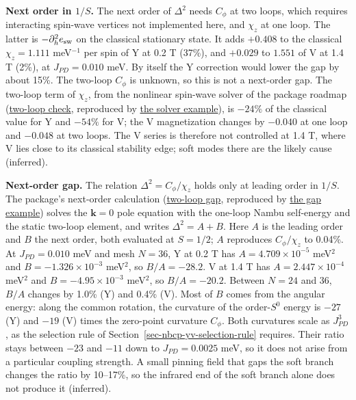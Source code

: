 \textbf{Next order in \(1/S\).} The next order of \(\Delta^2\) needs
\(C_\phi\) at two loops, which requires interacting spin-wave vertices
not implemented here, and \(\chi_z\) at one loop. The latter is
\(-\partial_h^2e_{\rm sw}\) on the classical stationary state. It adds
\(+0.408\) to the classical \(\chi_z=1.111\) meV\(^{-1}\) per spin of
Y at 0.2 T (37\%), and \(+0.029\) to \(1.551\) of V at 1.4 T (2\%), at
\(J_{PD}=0.010\) meV. By itself the Y correction would lower the gap by
about 15\%. The two-loop \(C_\phi\) is unknown, so this is not a
next-order gap. The two-loop term of \(\chi_z\), from the nonlinear
spin-wave solver of the package roadmap
(\href{../../../data-space/verification/261003-nbcp-nonlinear-spin-waves/nbcp-nonlinear-spin-waves.json}{two-loop
check}, reproduced by
\href{../../../examples/nbcp_nonlinear_spin_waves.py}{the solver
example}), is \(-24\%\) of the classical
value for Y and \(-54\%\) for V; the V magnetization changes by
\(-0.040\) at one loop and \(-0.048\) at two loops. The V series is
therefore not controlled at 1.4 T, where V lies close to its classical
stability edge; soft modes there are the likely cause (inferred).

\textbf{Next-order gap.} The relation \(\Delta^2=C_\phi/\chi_z\) holds
only at leading order in \(1/S\). The package's next-order calculation
(\href{../../../data-space/verification/261003-nbcp-two-loop-gap/nbcp-two-loop-gap.json}{two-loop
gap}, reproduced by
\href{../../../examples/nbcp_pseudo_goldstone_two_loop.py}{the gap
example}) solves the \(\mathbf k=0\) pole equation with the one-loop
Nambu self-energy and the static two-loop element, and writes
\(\Delta^2=A+B\). Here \(A\) is the leading order and \(B\) the next
order, both evaluated at \(S=1/2\); \(A\) reproduces \(C_\phi/\chi_z\) to
0.04\%. At \(J_{PD}=0.010\) meV and mesh \(N=36\), Y at 0.2 T has
\(A=4.709\times10^{-5}\) meV\(^2\) and \(B=-1.326\times10^{-3}\)
meV\(^2\), so \(B/A=-28.2\). V at 1.4 T has \(A=2.447\times10^{-4}\)
meV\(^2\) and \(B=-4.95\times10^{-3}\) meV\(^2\), so \(B/A=-20.2\).
Between \(N=24\) and 36, \(B/A\) changes by 1.0\% (Y) and 0.4\% (V).
Most of \(B\) comes from the angular energy: along the common rotation,
the curvature of the order-\(S^0\) energy is \(-27\) (Y) and \(-19\) (V)
times the zero-point curvature \(C_\phi\). Both curvatures scale as
\(J_{PD}^3\), as the selection rule of
Section~\ref{sec-nbcp-yv-selection-rule} requires. Their ratio stays
between \(-23\) and \(-11\) down to \(J_{PD}=0.0025\) meV, so it does not
arise from a particular coupling strength. A small pinning field that
gaps the soft branch changes the ratio by 10--17\%, so the infrared end
of the soft branch alone does not produce it (inferred).

